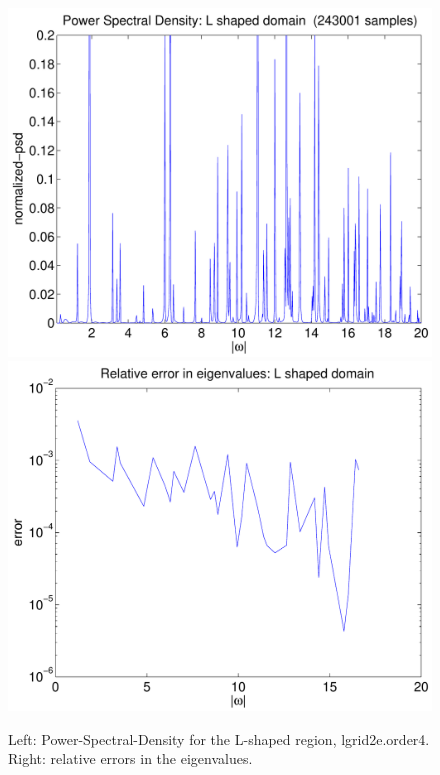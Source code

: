 \begin{figure}
\begin{center}
\includegraphics[width=\figWidth]{figures/psd-lgrid2e-4}
\includegraphics[width=\figWidth]{figures/eigenValues-relErr-lgrid2e-4}
\end{center}
\caption{Left: Power-Spectral-Density for the L-shaped region, lgrid2e.order4. 
         Right: relative errors in the eigenvalues.}
\end{figure}

